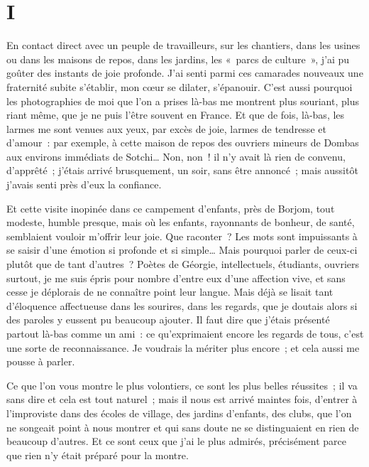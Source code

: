 \documentclass[twoside]{book} %
\newcommand{\astermono}{\medskip\centerline{\color{rubric}\large\selectfont{\syms ✻}}\medskip\par}%
\newcommand\chapteropen{} %
\newcommand\chaptercont{} %
\begin{document}
\chapteropen

\chapter[{I}]{I}
\renewcommand{\leftmark}{I}


\chaptercont
\noindent En contact direct avec un peuple de travailleurs, sur les chantiers, dans les usines ou dans les maisons de repos, dans les jardins, les « parcs de culture », j’ai pu goûter des instants de joie profonde. J’ai senti parmi ces camarades nouveaux une fraternité subite s’établir, mon cœur se dilater, s’épanouir. C’est aussi pourquoi les photographies de moi que l’on a prises là-bas me montrent plus souriant, plus riant même, que je ne puis l’être souvent en France. Et que de fois, là-bas, les larmes me sont venues aux yeux, par excès de joie, larmes de tendresse et d’amour : par exemple, à cette maison de repos des ouvriers mineurs de Dombas aux environs immédiats de Sotchi… Non, non ! il n’y avait là rien de convenu, d’apprêté ; j’étais arrivé brusquement, un soir, sans être annoncé ; mais aussitôt j’avais senti près d’eux la confiance.\par
Et cette visite inopinée dans ce campement d’enfants, près de Borjom, tout modeste, humble presque, mais où les enfants, rayonnants de bonheur, de santé, semblaient vouloir m’offrir leur joie. Que raconter ? Les mots sont impuissants à se saisir d’une émotion si profonde et si simple… Mais pourquoi parler de ceux-ci plutôt que de tant d’autres ? Poètes de Géorgie, intellectuels, étudiants, ouvriers surtout, je me suis épris pour nombre d’entre eux d’une affection vive, et sans cesse je déplorais de ne connaître point leur langue. Mais déjà se lisait tant d’éloquence affectueuse dans les sourires, dans les regards, que je doutais alors si des paroles y eussent pu beaucoup ajouter. Il faut dire que j’étais présenté partout là-bas comme un ami : ce qu’exprimaient encore les regards de tous, c’est une sorte de reconnaissance. Je voudrais la mériter plus encore ; et cela aussi me pousse à parler.\par

\astermono

\noindent Ce que l’on vous montre le plus volontiers, ce sont les plus belles réussites ; il va sans dire et cela est tout naturel ; mais il nous est arrivé maintes fois, d’entrer à l’improviste dans des écoles de village, des jardins d’enfants, des clubs, que l’on ne songeait point à nous montrer et qui sans doute ne se distinguaient en rien de beaucoup d’autres. Et ce sont ceux que j’ai le plus admirés, précisément parce que rien n’y était préparé pour la montre.\par
\end{document}
